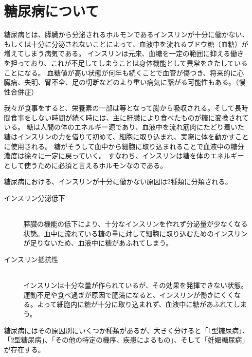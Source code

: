 
\chapter{糖尿病について}
\label{chap:diabetes}

糖尿病とは、膵臓から分泌されるホルモンであるインスリンが十分に働かない、もしくは十分に分泌されないことによって、血液中を流れるブドウ糖（血糖）が増えてしまう病気である。\cite{diabetes}
インスリンは元来、血糖を一定の範囲に抑える働きを担っており、これが不足してしまうことは身体機能として異常をきたしていることになる。
血糖値が高い状態が何年も続くことで血管が傷つき、将来的に心臓病、失明、腎不全、足の切断などのより重い病気に繋がる可能性もある。（慢性合併症）

我々が食事をすると、栄養素の一部は等となって腸から吸収される。そして長時間食事をしない時間が続く時には、主に肝臓により食べたものが糖に変換されている。
糖は人間の体のエネルギー源であり、血液中を流れ筋肉にたどり着いた糖はインスリンの力を借りて初めて、細胞に取り込まれ、実際に体を動かすことに使用される。
糖がそうして血中から細胞に取り込まれることで血液中の糖分濃度は徐々に一定に戻っていく。
すなわち、インスリンは糖を体のエネルギーとして使うために必須と言えるホルモンなのである。\cite{diabetes}

糖尿病における、インスリンが十分に働かない原因は2種類に分類される。\cite{diabetes}

\begin{description}
  \item [インスリン分泌低下]\mbox{}\\
    膵臓の機能の低下により、十分なインスリンを作れず分泌量が少なくなる状態。血中に流れている糖の量に対して細胞に取り込むためのインスリンが足りないため、血液中に糖があふれてしまう。
  \item [インスリン抵抗性]\mbox{}\\
    インスリンは十分な量が作られているが、その効果を発揮できない状態。運動不足や食べ過ぎが原因で肥満になると、インスリンが働きにくくなる。よって細胞内に糖が十分に取り込まれず、血液中に糖があふれてしまう。
\end{description}

糖尿病にはその原因別にいくつか種類があるが、大きく分けると「1型糖尿病」、「2型糖尿病」、「その他の特定の機序、疾患によるもの」、そして「妊娠糖尿病」が存在する。\cite{diabetes}

